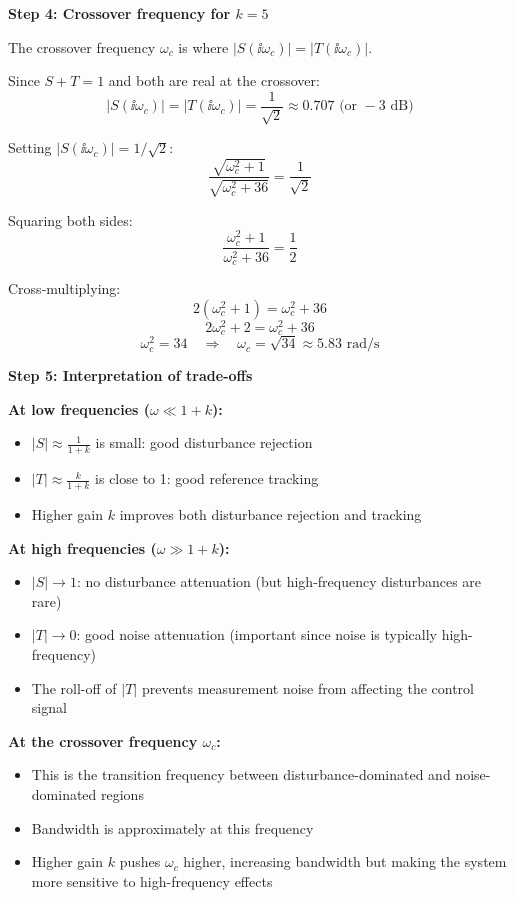 \documentclass[11pt,a4paper]{article}
\begin{document}
\textbf{Step 4: Crossover frequency for $k = 5$}

The crossover frequency $\omega_c$ is where $|S(\ii\omega_c)| = |T(\ii\omega_c)|$.

Since $S + T = 1$ and both are real at the crossover:
\[
|S(\ii\omega_c)| = |T(\ii\omega_c)| = \frac{1}{\sqrt{2}} \approx 0.707 \text{ (or } -3 \text{ dB)}
\]

Setting $|S(\ii\omega_c)| = 1/\sqrt{2}$:
\[
\frac{\sqrt{\omega_c^2 + 1}}{\sqrt{\omega_c^2 + 36}} = \frac{1}{\sqrt{2}}
\]

Squaring both sides:
\[
\frac{\omega_c^2 + 1}{\omega_c^2 + 36} = \frac{1}{2}
\]

Cross-multiplying:
\[
2(\omega_c^2 + 1) = \omega_c^2 + 36
\]
\[
2\omega_c^2 + 2 = \omega_c^2 + 36
\]
\[
\omega_c^2 = 34 \quad \Rightarrow \quad \omega_c = \sqrt{34} \approx 5.83 \text{ rad/s}
\]

\textbf{Step 5: Interpretation of trade-offs}

\textbf{At low frequencies ($\omega \ll 1+k$):}
\begin{itemize}
\item $|S| \approx \frac{1}{1+k}$ is small: good disturbance rejection
\item $|T| \approx \frac{k}{1+k}$ is close to 1: good reference tracking
\item Higher gain $k$ improves both disturbance rejection and tracking
\end{itemize}

\textbf{At high frequencies ($\omega \gg 1+k$):}
\begin{itemize}
\item $|S| \to 1$: no disturbance attenuation (but high-frequency disturbances are rare)
\item $|T| \to 0$: good noise attenuation (important since noise is typically high-frequency)
\item The roll-off of $|T|$ prevents measurement noise from affecting the control signal
\end{itemize}

\textbf{At the crossover frequency $\omega_c$:}
\begin{itemize}
\item This is the transition frequency between disturbance-dominated and noise-dominated regions
\item Bandwidth is approximately at this frequency
\item Higher gain $k$ pushes $\omega_c$ higher, increasing bandwidth but making the system more sensitive to high-frequency effects
\end{itemize}
\end{document}
